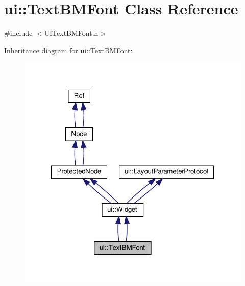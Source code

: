 \hypertarget{classui_1_1TextBMFont}{}\section{ui\+:\+:Text\+B\+M\+Font Class Reference}
\label{classui_1_1TextBMFont}


{\ttfamily \#include $<$U\+I\+Text\+B\+M\+Font.\+h$>$}



Inheritance diagram for ui\+:\+:Text\+B\+M\+Font\+:
\nopagebreak
\begin{figure}[H]
\begin{center}
\leavevmode
\includegraphics[width=320pt]{classui_1_1TextBMFont__inherit__graph}
\end{center}
\end{figure}


